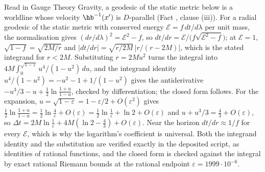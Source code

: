 Read in Gauge Theory Gravity, a geodesic of the static metric below is a worldline whose velocity $\hb^{-1}(x')$ is $D$-parallel (Fact , clause (iii)). For a radial geodesic of the static metric with conserved energy $\mathcal{E} = f\,dt/d\lambda$ per unit mass, the normalisation gives $(dr/d\lambda)^{2} = \mathcal{E}^{2} - f$, so $dt/dr = \mathcal{E}/\bigl(f\sqrt{\mathcal{E}^{2} - f}\bigr)$; at $\mathcal{E} = 1$, $\sqrt{1 - f} = \sqrt{2M/r}$ and $|dt/dr| = \sqrt{r/2M}\,\bigl|r/(r - 2M)\bigr|$, which is the stated integrand for $r < 2M$. Substituting $r = 2Mu^{2}$ turns the integral into $4M\int_0^{\sqrt{1-\varepsilon}} u^{4}/(1 - u^{2})\,du$, and the integrand identity $u^{4}/(1 - u^{2}) = -u^{2} - 1 + 1/(1 - u^{2})$ gives the antiderivative $-u^{3}/3 - u + \tfrac12\ln\frac{1+u}{1-u}$, checked by differentiation; the closed form follows. For the expansion, $u = \sqrt{1 - \varepsilon} = 1 - \varepsilon/2 + O(\varepsilon^{2})$ gives $\tfrac12\ln\frac{1+u}{1-u} = \tfrac12\ln\frac{4}{\varepsilon} + O(\varepsilon) = \tfrac12\ln\tfrac1\varepsilon + \ln 2 + O(\varepsilon)$ and $u + u^{3}/3 = \tfrac43 + O(\varepsilon)$, so $\Delta t = 2M\ln\tfrac1\varepsilon + 4M(\ln 2 - \tfrac43) + O(\varepsilon)$. Near the horizon $dt/dr \approx 1/f$ for every $\mathcal{E}$, which is why the logarithm's coefficient is universal. Both the integrand identity and the substitution are verified exactly in the deposited script, as identities of rational functions, and the closed form is checked against the integral by exact rational Riemann bounds at the rational endpoint $\varepsilon = 1999 \cdot 10^{-6}$.
